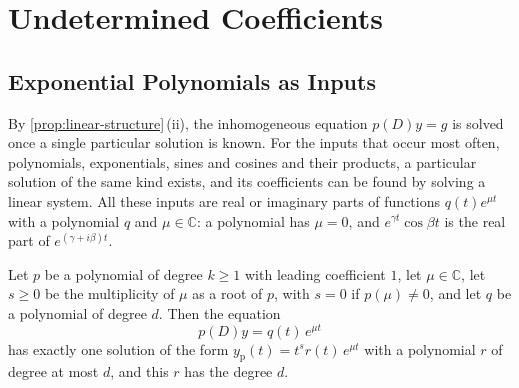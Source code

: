 \section{Undetermined Coefficients}
\label{sec:undetermined}

\subsection{Exponential Polynomials as Inputs}

By \cref{prop:linear-structure}\,(ii), the inhomogeneous equation $p(D)y=g$ is solved once a single particular solution is known. For the inputs that occur most often, polynomials, exponentials, sines and cosines and their products, a particular solution of the same kind exists, and its coefficients can be found by solving a linear system. All these inputs are real or imaginary parts of functions $q(t)e^{\mu t}$ with a polynomial $q$ and $\mu\in\mathbb C$: a polynomial has $\mu=0$, and $e^{\gamma t}\cos\beta t$ is the real part of $e^{(\gamma+i\beta)t}$.

\begin{theorem}
\label{thm:undetermined}
Let $p$ be a polynomial of degree $k\ge1$ with leading coefficient $1$, let $\mu\in\mathbb C$, let $s\ge0$ be the multiplicity of $\mu$ as a root of $p$, with $s=0$ if $p(\mu)\ne0$, and let $q$ be a polynomial of degree $d$. Then the equation
\[
p(D)y=q(t)\,e^{\mu t}
\]
has exactly one solution of the form $y_{\mathrm p}(t)=t^sr(t)\,e^{\mu t}$ with a polynomial $r$ of degree at most $d$, and this $r$ has the degree $d$.
\end{theorem}

